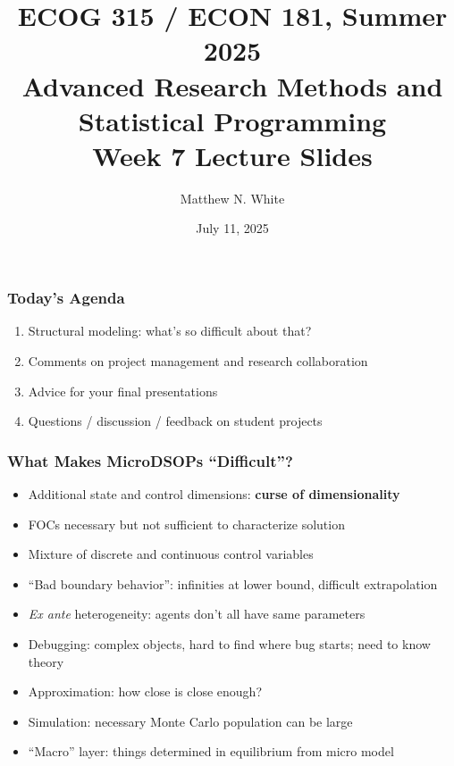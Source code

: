 \documentclass[aspectratio=169]{beamer}
\author{Matthew N. White}
\title[add]{ECOG 315 / ECON 181, Summer 2025 \\ Advanced Research Methods and Statistical Programming \\ Week 7 Lecture Slides}
\institute[HU]{Howard University}
\date{July 11, 2025}
\begin{document}
\begin{frame}
\maketitle
\end{frame}



\begin{frame}
\frametitle{Today's Agenda}
\begin{enumerate}	
	\item Structural modeling: what's so difficult about that?
	
	\item Comments on project management and research collaboration
	
	\item Advice for your final presentations
	
	\item Questions / discussion / feedback on student projects
\end{enumerate}
\end{frame}


\begin{frame}
\frametitle{What Makes MicroDSOPs ``Difficult''?}
\begin{itemize}
	\item Additional state and control dimensions: \textbf{curse of dimensionality}
	
	\item <2->FOCs necessary but not sufficient to characterize solution
	
	\item <2->Mixture of discrete and continuous control variables
	
	\item <3->``Bad boundary behavior'': infinities at lower bound, difficult extrapolation
	
	\item <4->\textit{Ex ante} heterogeneity: agents don't all have same parameters
	
	\item <5->Debugging: complex objects, hard to find where bug starts; need to know theory
	
	\item <6->Approximation: how close is close enough?
	
	\item <6->Simulation: necessary Monte Carlo population can be large
	
	\item <7->``Macro'' layer: things determined in equilibrium from micro model
\end{itemize}
\end{frame}
\end{document}

